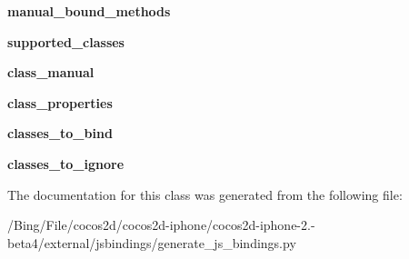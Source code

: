 \begin{DoxyCompactItemize}
\item 
\hypertarget{classgenerate__js__bindings_1_1_j_s_bindings_a2d85d70406bf3b4e5670bcf34dccac07}{{\bfseries manual\-\_\-bound\-\_\-methods}}\label{classgenerate__js__bindings_1_1_j_s_bindings_a2d85d70406bf3b4e5670bcf34dccac07}

\item 
\hypertarget{classgenerate__js__bindings_1_1_j_s_bindings_a7723a6c4da3c342ec6638bfc8636b45d}{{\bfseries supported\-\_\-classes}}\label{classgenerate__js__bindings_1_1_j_s_bindings_a7723a6c4da3c342ec6638bfc8636b45d}

\item 
\hypertarget{classgenerate__js__bindings_1_1_j_s_bindings_a7f0b1d78e3894ba81215b01cfc02b6fa}{{\bfseries class\-\_\-manual}}\label{classgenerate__js__bindings_1_1_j_s_bindings_a7f0b1d78e3894ba81215b01cfc02b6fa}

\item 
\hypertarget{classgenerate__js__bindings_1_1_j_s_bindings_a2dcf614191f744e56d5917d532b10d3c}{{\bfseries class\-\_\-properties}}\label{classgenerate__js__bindings_1_1_j_s_bindings_a2dcf614191f744e56d5917d532b10d3c}

\item 
\hypertarget{classgenerate__js__bindings_1_1_j_s_bindings_a88db2a3dc9ec340cca085ce91e3decd0}{{\bfseries classes\-\_\-to\-\_\-bind}}\label{classgenerate__js__bindings_1_1_j_s_bindings_a88db2a3dc9ec340cca085ce91e3decd0}

\item 
\hypertarget{classgenerate__js__bindings_1_1_j_s_bindings_a28c3e5186e60367bd9ff475127c50714}{{\bfseries classes\-\_\-to\-\_\-ignore}}\label{classgenerate__js__bindings_1_1_j_s_bindings_a28c3e5186e60367bd9ff475127c50714}

\end{DoxyCompactItemize}


The documentation for this class was generated from the following file\-:\begin{DoxyCompactItemize}
\item 
/\-Bing/\-File/cocos2d/cocos2d-\/iphone/cocos2d-\/iphone-\/2.-\/beta4/external/jsbindings/generate\-\_\-js\-\_\-bindings.\-py\end{DoxyCompactItemize}
